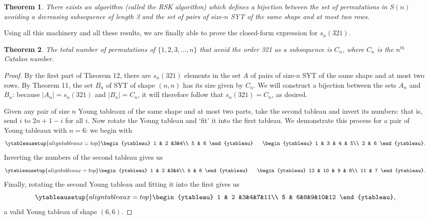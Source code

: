 \documentclass[11pt,letterpaper,twoside,english]{article}
\theoremstyle{theorem}
\newtheorem{theorem}{Theorem}
\theoremstyle{remark}
\begin{document}
\begin{theorem}
There exists an algorithm (called the \emph{RSK algorithm}) which defines a bijection between the set of permutations in $S(n)$ avoiding a decreasing subsequence of length 3 and the set of pairs of size-$n$ SYT of the same shape and at most two rows. 
\end{theorem}
Using all this machinery and all these results, we are finally able to prove the closed-form expression for $s_n(321)$.
\begin{theorem}
The total number of permutations of $\{1,2,3,\ldots, n\}$ that avoid the order 321 as a subsequence is $C_n$, where $C_n$ is the $n^{th}$ Catalan number.
\end{theorem}
\begin{proof}
By the first part of Theorem 12, there are $s_n(321)$ elements in the set $A$ of pairs of size-$n$ SYT of the same shape and at most two rows. By Theorem 11, the set $B_n$ of SYT of shape $(n, n)$ has its size given by $C_n$. We will construct a bijection between the sets $A_n$ and $B_n$: because $|A_n|=s_n(321)$ and $|B_n|=C_n$, it will therefore follow that $s_n(321)=C_n$, as desired.

Given any pair of size $n$ Young tableaux of the same shape and at most two parts, take the second tableau and invert its numbers: that is, send $i$ to $2n+1-i$ for all $i$. Now rotate the Young tableau and `fit' it into the first tableau. We demonstrate this process for a pair of Young tableaux with $n=6$: we begin with
\[\ytableausetup{aligntableaux=top}
\begin{ytableau}
1 & 2 &3&4\\
5 & 6
\end{ytableau} \ \ \ \ \ 
\hfill
\begin{ytableau}
1 & 3 & 4 & 5\\
2 & 6
\end{ytableau}.\]
Inverting the numbers of the second tableau gives us
\[\ytableausetup{aligntableaux=top}
\begin{ytableau}
1 & 2 &3&4\\
5 & 6
\end{ytableau} \ \ \ \ \ 
\hfill
\begin{ytableau}
12 & 10 & 9 & 8\\
11 & 7
\end{ytableau}.\]
Finally, rotating the second Young tableau and fitting it into the first gives us
\[\ytableausetup{aligntableaux=top}
\begin{ytableau}
1 & 2 &3&4&7&11\\
5 & 6&8&9&10&12
\end{ytableau},\]
a valid Young tableau of shape $(6, 6)$. 


\end{proof}
\end{document}
